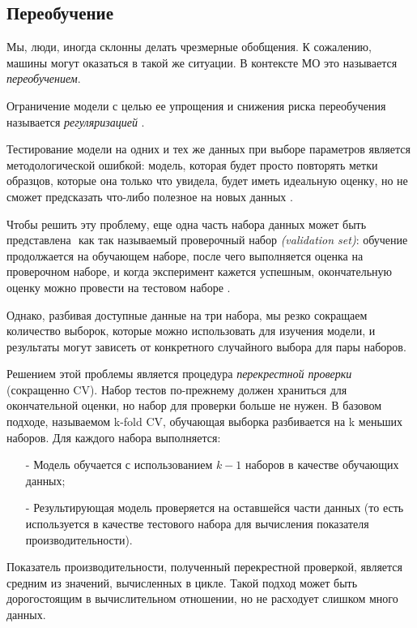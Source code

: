 \subsection{Переобучение}
Мы, люди, иногда склонны делать чрезмерные обобщения. К сожалению,
машины могут оказаться в такой же ситуации. В контексте МО это называется
\emph{переобучением}.

Ограничение модели с целью ее упрощения и снижения риска переобучения
называется \emph{регуляризацией} \cite{scikitBook}.

Тестирование модели на одних и тех же данных при выборе параметров является
методологической ошибкой: модель, которая будет просто повторять метки
образцов, которые она только что увидела, будет иметь идеальную оценку, но
не сможет предсказать что-либо полезное на новых данных \cite{scikitTuning}.

Чтобы решить эту проблему, еще одна часть набора данных может быть представлена ​​
как так называемый проверочный набор \emph{(validation set)}: обучение продолжается
на обучающем наборе, после чего выполняется оценка на проверочном наборе, и
когда эксперимент кажется успешным, окончательную оценку можно провести на
тестовом наборе \cite{scikitCV}.

Однако, разбивая доступные данные на три набора, мы резко сокращаем количество
выборок, которые можно использовать для изучения модели, и результаты могут
зависеть от конкретного случайного выбора для пары наборов.

Решением этой проблемы является процедура \emph{перекрестной проверки} (сокращенно CV).
Набор тестов по-прежнему должен храниться для окончательной оценки, но набор для
проверки больше не нужен. В базовом подходе, называемом k-fold CV,
обучающая выборка разбивается на k меньших наборов. Для каждого набора
выполняется:

\begin{itemize}
    \item[-] Модель обучается с использованием $k - 1$ наборов в качестве обучающих данных;
    \item[-] Результирующая модель проверяется на оставшейся части данных (то есть
    используется в качестве тестового набора для вычисления показателя
    производительности).
\end{itemize}

Показатель производительности, полученный перекрестной проверкой, является
средним из значений, вычисленных в цикле. Такой подход может быть дорогостоящим
в вычислительном отношении, но не расходует слишком много данных.
